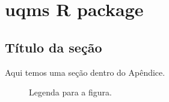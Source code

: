 \chapter{uqms R package}\label{apendiceA}

\lipsum[50]

\section{Título da seção}

Aqui temos uma seção dentro do Apêndice.

\begin{figure}
    \begin{center}
        \caption{Legenda para a figura.}
        \label{rotulo1}
    \end{center}
\end{figure}